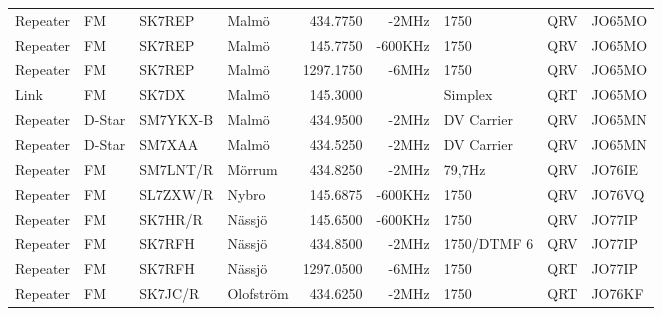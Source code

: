 \begin{landscape}
\begin{longtable}{llllrrlcl}
	Repeater                  & FM            & SK7REP        & Malmö               & 434.7750          & -2MHz          & 1750             & QRV             & JO65MO           \\
	Repeater                  & FM            & SK7REP        & Malmö               & 145.7750          & -600KHz        & 1750             & QRV             & JO65MO           \\
	Repeater                  & FM            & SK7REP        & Malmö               & 1297.1750         & -6MHz          & 1750             & QRV             & JO65MO           \\
	Link                      & FM            & SK7DX         & Malmö               & 145.3000          &                & Simplex          & QRT             & JO65MO           \\
	Repeater                  & D-Star        & SM7YKX-B      & Malmö               & 434.9500          & -2MHz          & DV Carrier       & QRV             & JO65MN           \\
	Repeater                  & D-Star        & SM7XAA        & Malmö               & 434.5250          & -2MHz          & DV Carrier       & QRV             & JO65MN           \\
	Repeater                  & FM            & SM7LNT/R      & Mörrum              & 434.8250          & -2MHz          & 79,7Hz           & QRV             & JO76IE           \\
	Repeater                  & FM            & SL7ZXW/R      & Nybro               & 145.6875          & -600KHz        & 1750             & QRV             & JO76VQ           \\
	Repeater                  & FM            & SK7HR/R       & Nässjö              & 145.6500          & -600KHz        & 1750             & QRV             & JO77IP           \\
	Repeater                  & FM            & SK7RFH        & Nässjö              & 434.8500          & -2MHz          & 1750/DTMF 6      & QRV             & JO77IP           \\
	Repeater                  & FM            & SK7RFH        & Nässjö              & 1297.0500         & -6MHz          & 1750             & QRT             & JO77IP           \\
	Repeater                  & FM            & SK7JC/R       & Olofström           & 434.6250          & -2MHz          & 1750             & QRT             & JO76KF           \\

\end{longtable}
\end{landscape}
